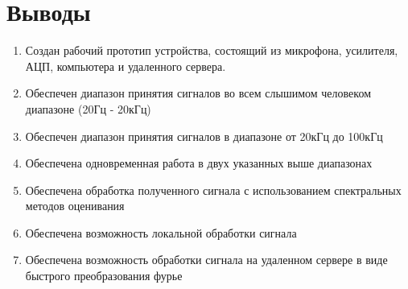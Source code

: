 \documentclass[../main.tex]{subfiles}
\begin{document}
\section*{Выводы}
%

\begin{enumerate}
  \item Создан рабочий прототип устройства, состоящий из микрофона, усилителя, АЦП, компьютера и удаленного сервера.
  \item Обеспечен диапазон принятия сигналов во всем слышимом человеком диапазоне (20Гц - 20кГц)
  \item Обеспечен диапазон принятия сигналов в диапазоне от 20кГц до 100кГц
  \item Обеспечена одновременная работа в двух указанных выше диапазонах
  \item Обеспечена обработка полученного сигнала с использованием спектральных методов оценивания
  \item Обеспечена возможность локальной обработки сигнала
  \item Обеспечена возможность обработки сигнала на удаленном сервере в виде быстрого преобразования фурье
\end{enumerate}
\newpage
\end{document}
